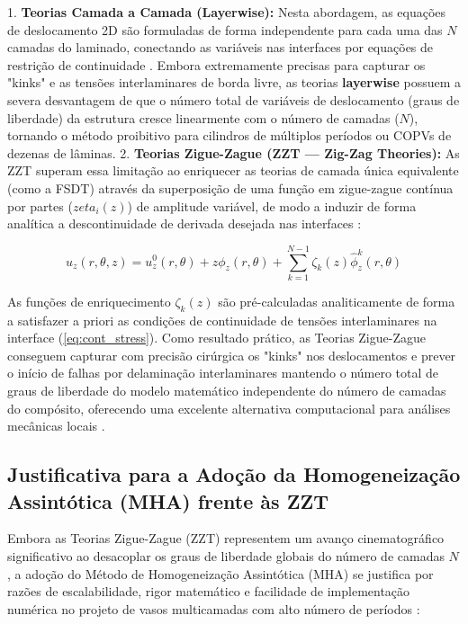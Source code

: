 1. \textbf{Teorias Camada a Camada (Layerwise):} Nesta abordagem, as equações de deslocamento 2D são formuladas de forma independente para cada uma das $N$ camadas do laminado, conectando as variáveis nas interfaces por equações de restrição de continuidade \cite{PartonReport}. Embora extremamente precisas para capturar os "kinks" e as tensões interlaminares de borda livre, as teorias \textbf{layerwise} possuem a severa desvantagem de que o número total de variáveis de deslocamento (graus de liberdade) da estrutura cresce linearmente com o número de camadas ($N$), tornando o método proibitivo para cilindros de múltiplos períodos ou COPVs de dezenas de lâminas.
2. \textbf{Teorias Zigue-Zague (ZZT — Zig-Zag Theories):} As ZZT superam essa limitação ao enriquecer as teorias de camada única equivalente (como a FSDT) através da superposição de uma função em zigue-zague contínua por partes ($zeta_i (z)$) de amplitude variável, de modo a induzir de forma analítica a descontinuidade de derivada desejada nas interfaces \cite{PartonReport}:

\begin{equation}
  u_z(r, \theta, z) = u_z^0(r, \theta) + z \phi_z(r, \theta) + \sum_{k=1}^{N-1} \zeta_k(z) \hat{\phi}_z^k(r, \theta)
  \label{eq:zzt_disp}
\end{equation}

As funções de enriquecimento $\zeta_k(z)$ são pré-calculadas analiticamente de forma a satisfazer a priori as condições de continuidade de tensões interlaminares na interface (\eqref{eq:cont_stress}). Como resultado prático, as Teorias Zigue-Zague conseguem capturar com precisão cirúrgica os "kinks" nos deslocamentos e prever o início de falhas por delaminação interlaminares mantendo o número total de graus de liberdade do modelo matemático independente do número de camadas do compósito, oferecendo uma excelente alternativa computacional para análises mecânicas locais \cite{PartonReport}.

\subsection{Justificativa para a Adoção da Homogeneização Assintótica (MHA) frente às ZZT}

Embora as Teorias Zigue-Zague (ZZT) representem um avanço cinematográfico significativo ao desacoplar os graus de liberdade globais do número de camadas $N$, a adoção do Método de Homogeneização Assintótica (MHA) se justifica por razões de escalabilidade, rigor matemático e facilidade de implementação numérica no projeto de vasos multicamadas com alto número de períodos \cite{bakhvalov1989}:

